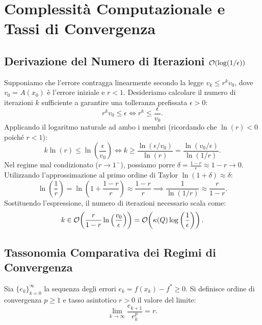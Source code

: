 \FloatBarrier
\section{Complessit\`a Computazionale e Tassi di Convergenza}
\label{sec:complessita-tassi-convergenza}

\subsection[Derivazione del Numero di Iterazioni O(log(1/epsilon))]{Derivazione del Numero di Iterazioni $\mathcal{O}\!\left(\log(1/\epsilon)\right)$}
Supponiamo che l'errore contragga linearmente secondo la legge $v_k \le r^k v_0$, dove $v_0 = A(x_0)$ \`e l'errore iniziale e $r < 1$. Desideriamo calcolare il numero di iterazioni $k$ sufficiente a garantire una tolleranza prefissata $\epsilon > 0$:
\begin{equation}
    r^k v_0 \le \epsilon \iff r^k \le \frac{\epsilon}{v_0}.
\end{equation}
Applicando il logaritmo naturale ad ambo i membri (ricordando che $\ln(r) < 0$ poich\'e $r < 1$):
\begin{equation}
    k \ln(r) \le \ln\left( \frac{\epsilon}{v_0} \right) \iff k \ge \frac{\ln(\epsilon / v_0)}{\ln(r)} = \frac{\ln(v_0 / \epsilon)}{\ln(1/r)}.
\end{equation}
Nel regime mal condizionato ($r \to 1^-$), possiamo porre $\delta = \frac{1 - r}{r} \approx 1 - r \to 0$. Utilizzando l'approssimazione al primo ordine di Taylor $\ln(1 + \delta) \approx \delta$:
\begin{equation}
    \ln\left( \frac{1}{r} \right) = \ln\left( 1 + \frac{1 - r}{r} \right) \approx \frac{1 - r}{r} \implies \frac{1}{\ln(1/r)} \approx \frac{r}{1 - r}.
\end{equation}
Sostituendo l'espressione, il numero di iterazioni necessario scala come:
\begin{equation}
    k \in \mathcal{O}\!\left(\frac{r}{1 - r} \ln\left( \frac{v_0}{\epsilon} \right)\right) = \mathcal{O}\!\left(\kappa(Q) \log\left( \frac{1}{\epsilon} \right)\right).
\end{equation}

\subsection{Tassonomia Comparativa dei Regimi di Convergenza}

\begin{definition}
Sia $\{e_k\}_{k=0}^\infty$ la sequenza degli errori $e_k = f(x_k) - f^* \ge 0$. Si definisce ordine di convergenza $p \ge 1$ e tasso asintotico $r > 0$ il valore del limite:
\begin{equation}
    \lim_{k \to \infty} \frac{e_{k+1}}{e_k^p} = r.
\end{equation}
\end{definition}

